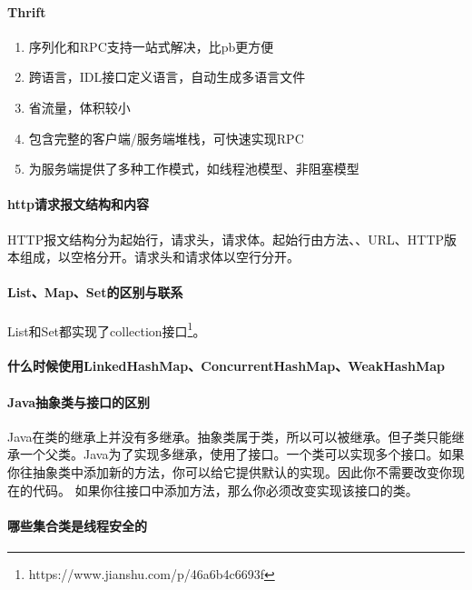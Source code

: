 \documentclass[../../../interview-questions.tex]{subfiles}
\begin{document}
\paragraph{Thrift}

\begin{enumerate}
\item {序列化和RPC支持一站式解决，比pb更方便}
\item{跨语言，IDL接口定义语言，自动生成多语言文件}
\item{省流量，体积较小}
\item{包含完整的客户端/服务端堆栈，可快速实现RPC}
\item{为服务端提供了多种工作模式，如线程池模型、非阻塞模型}
\end{enumerate}


\paragraph{http请求报文结构和内容}

HTTP报文结构分为起始行，请求头，请求体。起始行由方法、、URL、HTTP版本组成，以空格分开。请求头和请求体以空行分开。


\paragraph{List、Map、Set的区别与联系}

List和Set都实现了collection接口\footnote{https://www.jianshu.com/p/46a6b4c6693f}。


\paragraph{什么时候使用LinkedHashMap、ConcurrentHashMap、WeakHashMap}

\paragraph{Java抽象类与接口的区别}

Java在类的继承上并没有多继承。抽象类属于类，所以可以被继承。但子类只能继承一个父类。Java为了实现多继承，使用了接口。一个类可以实现多个接口。如果你往抽象类中添加新的方法，你可以给它提供默认的实现。因此你不需要改变你现在的代码。 如果你往接口中添加方法，那么你必须改变实现该接口的类。

\paragraph{哪些集合类是线程安全的}
\end{document}
